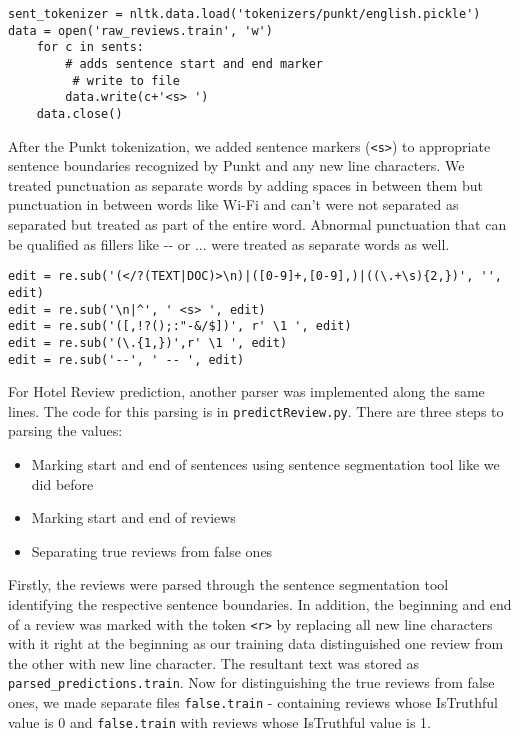 \documentclass{article}
\begin{document}
{\small
\begin{verbatim}
sent_tokenizer = nltk.data.load('tokenizers/punkt/english.pickle')
data = open('raw_reviews.train', 'w')
    for c in sents:
        # adds sentence start and end marker
         # write to file
        data.write(c+'<s> ')
    data.close()
\end{verbatim}
}

After the Punkt tokenization, we added sentence markers (\texttt{<s>}) to appropriate sentence boundaries recognized by Punkt and any new line characters. We treated punctuation as separate words by adding spaces in between them but punctuation in between words like Wi-Fi and can't were not separated as separated but treated as part of the entire word. Abnormal punctuation that can be qualified as fillers like -{}- or ... were treated as separate words as well.

{\small
\begin{verbatim}
edit = re.sub('(</?(TEXT|DOC)>\n)|([0-9]+,[0-9],)|((\.+\s){2,})', '', edit)
edit = re.sub('\n|^', ' <s> ', edit)
edit = re.sub('([,!?();:"-&/$])', r' \1 ', edit)
edit = re.sub('(\.{1,})',r' \1 ', edit)
edit = re.sub('--', ' -- ', edit)
\end{verbatim}
}

For Hotel Review prediction, another parser was implemented along the same lines. The code for this parsing is in \texttt{predictReview.py}. There are three steps to parsing the values:
\begin{itemize}[noitemsep,nolistsep]
\item Marking start and end of sentences using sentence segmentation tool like we did before
\item Marking start and end of reviews
\item Separating true reviews from false ones
\end{itemize}

Firstly, the reviews were parsed through the sentence segmentation tool identifying the respective sentence boundaries. In addition, the beginning and end of a review was marked with the token \texttt{<r>} by replacing all new line characters with it right at the beginning as our training data distinguished one review from the other with new line character. The resultant text was stored as \texttt{parsed\_predictions.train}. Now for distinguishing the true reviews from false ones, we made separate files \texttt{false.train} - containing reviews whose IsTruthful value is 0 and \texttt{false.train} with reviews whose IsTruthful value is 1.\par
\end{document}
